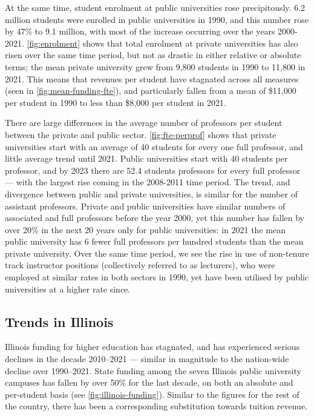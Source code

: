 At the same time, student enrolment at public universities rose precipitously.
6.2 million students were enrolled in public universities in 1990, and this number rose by 47\% to 9.1 million, with most of the increase occurring over the years 2000-2021.
\autoref{fig:enrolment} shows that total enrolment at private universities has also risen over the same time period, but not as drastic in either relative or absolute terms; the mean private university grew from 9,800 students in 1990 to 11,800 in 2021.
This means that revenues per student have stagnated across all measures (seen in \autoref{fig:mean-funding-fte}), and particularly fallen from a mean of \$11,000 per student in 1990 to less than \$8,000 per student in 2021.

There are large differences in the average number of professors per student between the private and public sector.
\autoref{fig:fte-perprof} shows that private universities start with an average of 40 students for every one full professor, and little average trend until 2021.
Public universities start with 40 students per professor, and by 2023 there are 52.4 students professors for every full professor --- with the largest rise coming in the 2008-2011 time period.
The trend, and divergence between public and private universities, is similar for the number of assistant professors.
Private and public universities have similar numbers of associated and full professors before the year 2000, yet this number has fallen by over 20\% in the next 20 years only for public universities: in 2021 the mean public university has 6 fewer full professors per hundred students than the mean private university.
Over the same time period, we see the rise in use of non-tenure track instructor positions (collectively referred to as  lecturers), who were employed at similar rates in both sectors in 1990, yet have been utilised by public universities at a higher rate since.

\subsection{Trends in Illinois}
\label{sec:trends-illinois}

Illinois funding for higher education has stagnated, and has experienced serious declines in the decade 2010--2021 --- similar in magnitude to the nation-wide decline over 1990--2021.
State funding among the seven Illinois public university campuses has fallen by over 50\% for the last decade, on both an absolute and per-student basis (see \autoref{fig:illinois-funding}).
Similar to the figures for the rest of the country, there has been a corresponding substitution towards tuition revenue.

